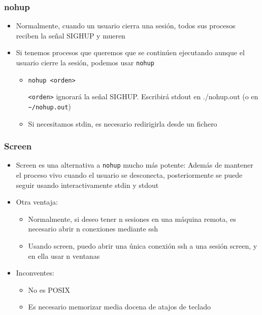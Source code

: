 \documentclass[ucs]{beamer}
\begin{document}
\begin{frame}[fragile]
\frametitle{nohup}
\begin{itemize}
\item
Normalmente, cuando un usuario cierra una sesión, todos sus procesos reciben
la señal SIGHUP y mueren
\item
Si tenemos procesos que queremos que se continúen ejecutando aunque el
usuario cierre la sesión, podemos usar \verb|nohup|
\begin{itemize}
\item
\verb|nohup <orden>|

\verb|<orden>| ignorará la señal SIGHUP. Escribirá stdout en ./nohup.out (o en \verb|~/nohup.out|)
\item
Si necesitamos stdin, es necesario redirigirla desde un fichero 
\end{itemize}
\end{itemize}

\end{frame}


\begin{frame}[fragile]
\frametitle{Screen}
\begin{itemize}
\item
Screen es una alternativa a \verb|nohup| mucho más potente: Además
de mantener el proceso vivo cuando el usuario se desconecta, posteriormente
se puede seguir usando interactivamente stdin y stdout
\item
Otra ventaja:

\begin{itemize}
\item
Normalmente, si deseo tener n sesiones en una máquina remota, es necesario abrir
n conexiones mediante ssh
\item
Usando screen, puedo abrir una única conexión ssh a una sesión screen, y en ella usar n ventanas
\end{itemize}
\item
Inconventes:
\begin{itemize}
\item
No es POSIX
\item
Es necesario memorizar media docena de atajos de teclado
\end{itemize}
\end{itemize}

\end{frame}
\end{document}
